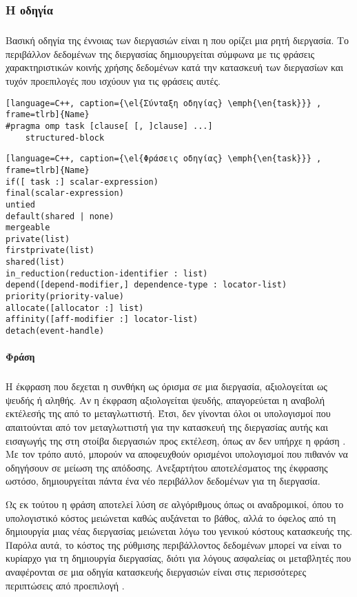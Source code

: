\subsubsection{Η οδηγία \emph{}}
\subparagraph{}
	Βασική οδηγία της έννοιας των διεργασιών είναι η \textbf{} που ορίζει μια ρητή διεργασία. Το περιβάλλον
	δεδομένων της διεργασίας δημιουργείται σύμφωνα με τις φράσεις χαρακτηριστικών κοινής χρήσης δεδομένων κατά την
	κατασκευή των διεργασίων και τυχόν προεπιλογές που ισχύουν για τις φράσεις αυτές\cite{thenextstep20}.
	
\begin{spacing}{1.1}
\begin{lstlisting}[language=C++, caption={\el{Σύνταξη οδηγίας} \emph{\en{task}}} , frame=tlrb]{Name}
#pragma omp task [clause[ [, ]clause] ...] 
	structured-block 
\end{lstlisting}
\begin{lstlisting}[language=C++, caption={\el{Φράσεις οδηγίας} \emph{\en{task}}} , frame=tlrb]{Name}
if([ task :] scalar-expression) 
final(scalar-expression) 
untied 
default(shared | none) 
mergeable 
private(list) 
firstprivate(list) 
shared(list) 
in_reduction(reduction-identifier : list) 
depend([depend-modifier,] dependence-type : locator-list) 
priority(priority-value) 
allocate([allocator :] list) 
affinity([aff-modifier :] locator-list) 
detach(event-handle)
\end{lstlisting}
\end{spacing}

\paragraph{Φράση }
\subparagraph{}
Η έκφραση που δεχεται η συνθήκη \textbf{} ως όρισμα σε μια διεργασία, αξιολογείται ως ψευδής ή αληθής. Αν η έκφραση
αξιολογείται ψευδής, απαγορεύεται η αναβολή εκτέλεσής της από το μεταγλωττιστή. Έτσι, δεν γίνονται όλοι οι
υπολογισμοί που απαιτούνται από τον μεταγλωττιστή για την κατασκευή της διεργασίας αυτής και εισαγωγής της στη στοίβα
διεργασιών προς εκτέλεση, όπως αν δεν υπήρχε η φράση \emph{}. Με τον τρόπο αυτό, μπορούν να αποφευχθούν ορισμένοι
υπολογισμοί που πιθανόν να οδηγήσουν σε μείωση της απόδοσης. Ανεξαρτήτου αποτελέσματος της έκφρασης ωστόσο,
δημιουργείται πάντα ένα νέο περιβάλλον δεδομένων για τη διεργασία.

Ως εκ τούτου η φράση \emph{} αποτελεί λύση σε αλγόριθμους όπως οι αναδρομικοί, όπου το υπολογιστικό κόστος
μειώνεται καθώς αυξάνεται το βάθος, αλλά το όφελος από τη δημιουργία μιας νέας διεργασίας μειώνεται λόγω του γενικού
κόστους κατασκευής της. Παρόλα αυτά, το κόστος της ρύθμισης περιβάλλοντος δεδομένων μπορεί να είναι το κυρίαρχο για τη
δημιουργία διεργασίας, διότι για λόγους ασφαλείας οι μεταβλητές που αναφέρονται σε μια οδηγία κατασκευής διεργασιών
είναι στις περισσότερες περιπτώσεις από προεπιλογή \emph{}\cite{parallel_dist}. 

